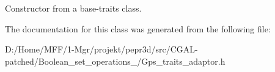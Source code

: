 Constructor from a base-\/traits class. 



The documentation for this class was generated from the following file\+:\begin{DoxyCompactItemize}
\item 
D\+:/\+Home/\+M\+F\+F/1-\/\+Mgr/projekt/pepr3d/src/\+C\+G\+A\+L-\/patched/\+Boolean\+\_\+set\+\_\+operations\+\_/Gps\+\_\+traits\+\_\+adaptor.\+h\end{DoxyCompactItemize}
